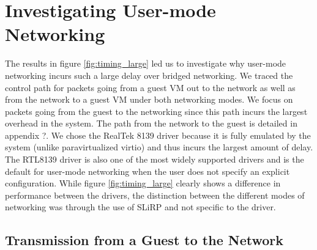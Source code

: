 \section{Investigating User-mode Networking}
\label{sec:trace}

The results in figure \ref{fig:timing_large} led us to investigate why user-mode networking incurs such a large delay over bridged networking.
We traced the control path for packets going from a guest VM out to the network as well as from the network to a guest VM under both networking modes.
We focus on packets going from the guest to the networking since this path incurs the largest overhead in the system.
The path from the network to the guest is detailed in appendix ?. %
We chose the RealTek 8139 driver because it is fully emulated by the system (unlike paravirtualized virtio) and thus incurs the largest amount of delay.
The RTL8139 driver is also one of the most widely supported drivers and is the default for user-mode networking when the user does not specify an explicit configuration.
While figure \ref{fig:timing_large} clearly shows a difference in performance between the drivers, the distinction between the different modes of networking was through the use of SLiRP and not specific to the driver.
%
%

\subsection{Transmission from a Guest to the Network}
\label{subsec:usermode}

